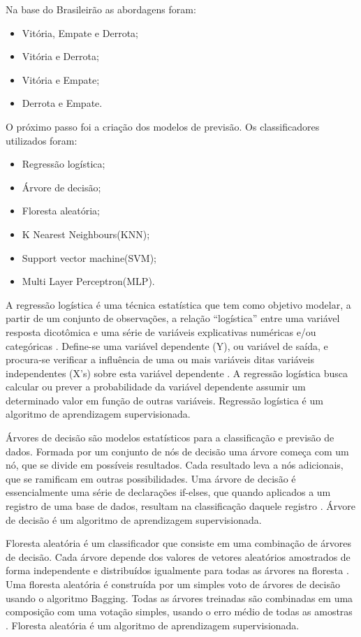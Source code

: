 	Na base do Brasileirão as abordagens foram:
	\begin{itemize}
	\item Vitória, Empate e Derrota;
	\item Vitória e Derrota;
	\item Vitória e Empate;
	\item Derrota e Empate.
	\end{itemize}
	
	O próximo passo foi a criação dos modelos de previsão. Os classificadores utilizados foram:
	\begin{itemize}
	\item Regressão logística;
	\item Árvore de decisão;
	\item Floresta aleatória;
	\item K Nearest Neighbours(KNN);
	\item Support vector machine(SVM);
	\item Multi Layer Perceptron(MLP).
	\end{itemize}
	
	A regressão logística é uma técnica estatística que tem como objetivo modelar, a partir de um conjunto de observações, a relação “logística” entre uma variável resposta dicotômica e uma série de variáveis explicativas numéricas e/ou categóricas \cite{Isolete2013}. Define-se uma variável dependente (Y), ou variável de saída, e procura-se verificar a influência de uma ou mais variáveis ditas variáveis independentes (X’s) sobre esta variável dependente \cite{Zanini2007}. A regressão logística busca calcular ou prever a probabilidade da variável dependente assumir um determinado valor em função de outras variáveis. Regressão logística é um algoritmo de aprendizagem supervisionada.
	
	Árvores de decisão são modelos estatísticos para a classificação e previsão de dados. Formada por um conjunto de nós de decisão uma árvore começa com um nó, que se divide em possíveis resultados. Cada resultado leva a nós adicionais, que se ramificam em outras possibilidades. Uma árvore de decisão é essencialmente uma série de declarações if-elses, que quando aplicados a um registro de uma base de dados, resultam na classificação daquele registro \cite{Caraciolo2009}. Árvore de decisão é um algoritmo de aprendizagem supervisionada.
	
	Floresta aleatória é um classificador que consiste em uma combinação de árvores de decisão. Cada árvore depende dos valores de vetores aleatórios amostrados de forma independente e distribuídos igualmente para todas as árvores na floresta \cite{Breiman2001}. Uma floresta aleatória é construída por um simples voto de árvores de decisão usando o algoritmo Bagging. Todas as árvores treinadas são combinadas em uma composição com uma votação simples, usando o erro médio de todas as amostras \cite{DMITRIEVSKY2018}. Floresta aleatória é um algoritmo de aprendizagem supervisionada.
	
